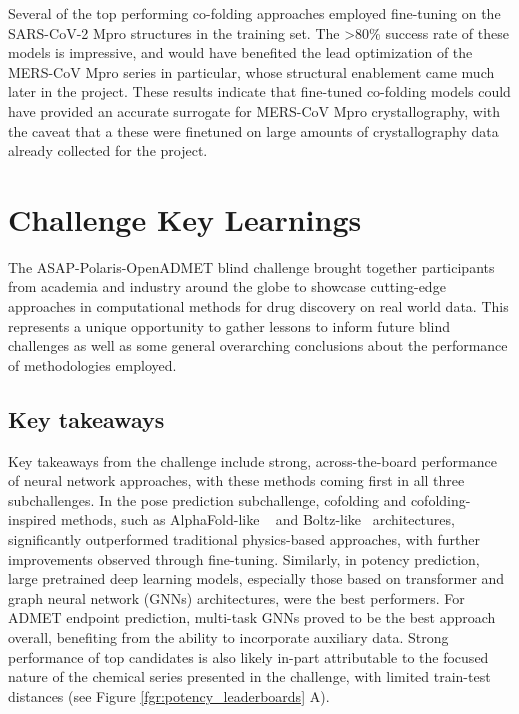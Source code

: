 \documentclass[journal=jcim,manuscript=article]{achemso}
\begin{document}
Several of the top performing co-folding approaches employed fine-tuning on the SARS-CoV-2 Mpro structures in the training set. The \textgreater 80\% success rate of these models is impressive, and would have benefited the lead optimization of the MERS-CoV Mpro series in particular, whose structural enablement came much later in the project. These results indicate that fine-tuned co-folding models could have provided an accurate surrogate for MERS-CoV Mpro crystallography, with the caveat that a these were finetuned on large amounts of crystallography data already collected for the project.

\section{Challenge Key Learnings}

The ASAP-Polaris-OpenADMET blind challenge brought together participants from academia and industry around the globe to showcase cutting-edge approaches in computational methods for drug discovery on real world data. This represents a unique opportunity to gather lessons to inform future blind challenges as well as some general overarching conclusions about the performance of methodologies employed.


\subsection{Key takeaways}

Key takeaways from the challenge include strong, across-the-board performance of neural network approaches, with these methods coming first in all three subchallenges. In the pose prediction subchallenge, cofolding and cofolding-inspired methods, such as AlphaFold-like ~\cite{abramson_2024_alphafold} and Boltz-like~\cite{wohlwend_2024_boltz-1, passaro_2025_boltz-2} architectures, significantly outperformed traditional physics-based approaches, with further improvements observed through fine-tuning. Similarly, in potency prediction, large pretrained deep learning models, especially those based on transformer and graph neural network (GNNs) architectures, were the best performers. For ADMET endpoint prediction, multi-task GNNs proved to be the best approach overall, benefiting from the ability to incorporate auxiliary data. Strong performance of top candidates is also likely in-part attributable to the focused nature of the chemical series presented in the challenge, with limited train-test distances (see Figure \ref{fgr:potency_leaderboards} A).
\end{document}
